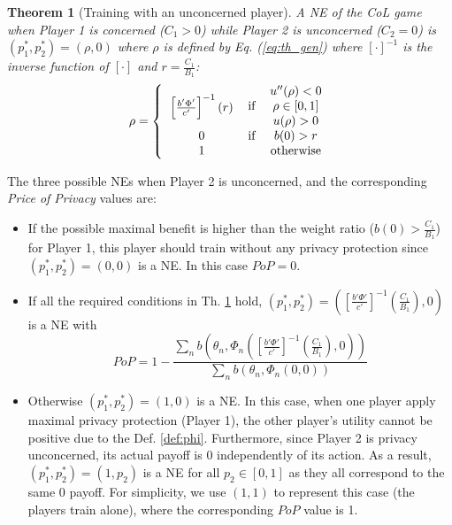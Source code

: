 \documentclass[USenglish,oneside,twocolumn]{article}
\theoremstyle{plain}
\newtheorem{theorem}{Theorem}
\begin{document}
    \vspace{-0.25cm}
    \begin{theorem}[Training with an unconcerned player]
        \label{th:c_vs_uc_gen}
        A NE of the CoL game when Player 1 is concerned ($C_1>0$) while Player 2 is unconcerned ($C_2=0$) is $(p_1^*,p_2^*)=(\rho,0)$ where $\rho$ is defined by Eq. (\ref{eq:th_gen}) where $[\cdot]^{-1}$ is the inverse function of $[\cdot]$ and $r=\frac{C_1}{B_1}$:
        \vspace{-0.1cm}
        \begin{equation}
        \label{eq:th_gen}
        \rho=\left\{
        \begin{tabular}{ccc} \multirow{3}{*}{$\left[\frac{b'\Phi'}{c'}\right]^{-1}(r)$} & \multirow{3}{*}{if} & $u''(\rho)<0$\\
        & & $\rho\in[0,1]$\\
        & & $u(\rho)>0$\\
        $0$ & if & $b(0)>r$\\
        $1$ &  & otherwise \\
        \end{tabular}\right.
        \end{equation}
    \end{theorem}
    \vspace{-0.25cm}
    
    The three possible NEs when Player 2 is unconcerned, and the corresponding \textit{Price of Privacy} values are:
    
    \begin{itemize}
        \item If the possible maximal benefit is higher than the weight ratio ($b(0)>\frac{C_1}{B_1}$) for Player 1, this player should train without any privacy protection since $(p_1^*,p_2^*)=(0,0)$ is a NE. In this case $PoP=0$.
        \item If all the required conditions in Th. \ref{th:c_vs_uc_gen}  hold, $(p_1^*,p_2^*)=\left(\left[\frac{b'\Phi'}{c'}\right]^{-1}\left(\frac{C_1}{B_1}\right),0\right)$ is a NE with
        \vspace{-0.1cm}
        \begin{equation*}	
        PoP=1-\frac{\sum_nb\left(\theta_n,\Phi_n\left(\left[\frac{b'\Phi'}{c'}\right]^{-1}\left(\frac{C_1}{B_1}\right),0\right)\right)}{\sum_nb(\theta_n,\Phi_n(0,0))}
        \end{equation*}
        \item Otherwise $(p_1^*,p_2^*)=(1,0)$ is a NE. In this case, when one player apply maximal privacy protection (Player 1), the other player's utility cannot be positive due to the Def. \ref{def:phi}. Furthermore, since Player 2 is privacy unconcerned, its actual payoff is 0 independently of its action. As a result, $(p_1^*,p_2^*)=(1,p_2)$ is a NE for all $p_2\in[0,1]$ as they all correspond to the same 0 payoff. For simplicity, we use $(1,1)$ to represent this case (the players train alone), where the corresponding $PoP$ value is 1.
    \end{itemize}
    \vspace{-0.25cm}
    
\end{document}
